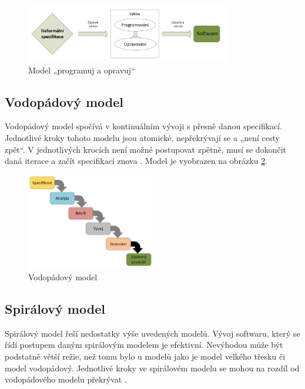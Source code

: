 \begin{figure}[h]
	\centering
	\includegraphics[width=0.8\textwidth]{Figures/programuj-a-opravuj.png}
	\caption{Model „programuj a opravuj“}
	\label{fig:program-and-repair-model}
\end{figure}

\subsection{Vodopádový model}
Vodopádový model spočívá v kontinuálním vývoji s přesně danou specifikací. Jednotlivé kroky tohoto modelu jsou atomické, nepřekrývají se a „není cesty zpět“. V jednotlivých krocích není možné postupovat zpětně, musí se dokončit daná iterace a začít specifikací znova \cite{Patton2002}. Model je vyobrazen na obrázku \ref{fig:waterfall-model}.

\begin{figure}[h]
	\centering
	\includegraphics[width=0.5\textwidth]{Figures/vodopad-model.png}
	\caption{Vodopádový model}
	\label{fig:waterfall-model}
\end{figure}

\subsection{Spirálový model}
Spirálový model řeší nedostatky výše uvedených modelů. Vývoj softwaru, který se řídí postupem daným spirálovým modelem je efektivní. Nevýhodou může být podstatně větší režie, než tomu bylo u modelů jako je model velkého třesku či model vodopádový. Jednotlivé kroky ve spirálovém modelu se mohou na rozdíl od vodopádového modelu překrývat \cite{Patton2002}.


